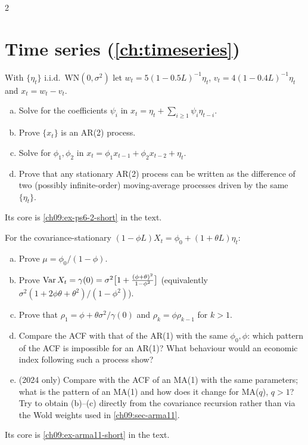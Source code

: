 \begin{paracol}{2}
\section{Time series (\cref{ch:timeseries})}\label{exam:ch09}

\begin{exercise}\label{ch09:ex-ps6-2}
With $\{\eta_t\}$ i.i.d.\ $\mathrm{WN}(0,\sigma^2)$ let $w_t=5(1-0.5L)^{-1}\eta_t$, $v_t=4(1-0.4L)^{-1}\eta_t$ and $x_t=w_t-v_t$.
\begin{enumerate}[(a)]
  \item Solve for the coefficients $\psi_i$ in $x_t=\eta_t+\sum_{i\ge1}\psi_i\eta_{t-i}$.
  \item Prove $\{x_t\}$ is an AR(2) process.
  \item Solve for $\phi_1,\phi_2$ in $x_t=\phi_1x_{t-1}+\phi_2x_{t-2}+\eta_t$.
  \item Prove that any stationary AR(2) process can be written as the difference of two (possibly infinite-order) moving-average processes driven by the same $\{\eta_t\}$.
\end{enumerate}
Its core is \cref{ch09:ex-ps6-2-short} in the text.
\end{exercise}

\begin{exercise}\label{ch09:ex-arma11}
For the covariance-stationary $(1-\phi L)X_t=\phi_0+(1+\theta L)\eta_t$:
\begin{enumerate}[(a)]
  \item Prove $\mu=\phi_0/(1-\phi)$.
  \item Prove $\operatorname{Var} X_t=\gamma(0)=\sigma^2\bigl[1+\frac{(\phi+\theta)^2}{1-\phi^2}\bigr]$
      (equivalently $\sigma^2(1+2\phi\theta+\theta^2)/(1-\phi^2)$).
  \item Prove that $\rho_1=\phi+\theta\sigma^2/\gamma(0)$ and $\rho_k=\phi\rho_{k-1}$ for $k>1$.
  \item Compare the ACF with that of the AR(1) with the same $\phi_0,\phi$: which pattern of the ACF is impossible for an AR(1)?
      What behaviour would an economic index following such a process show?
  \item (2024 only) Compare with the ACF of an MA(1) with the same parameters; what is the pattern of an MA(1) and how does it change for MA($q$), $q>1$?
      Try to obtain (b)--(c) directly from the covariance recursion rather than via the Wold weights used in \cref{ch09:sec-arma11}.
\end{enumerate}
Its core is \cref{ch09:ex-arma11-short} in the text.
\end{exercise}


\end{paracol}
